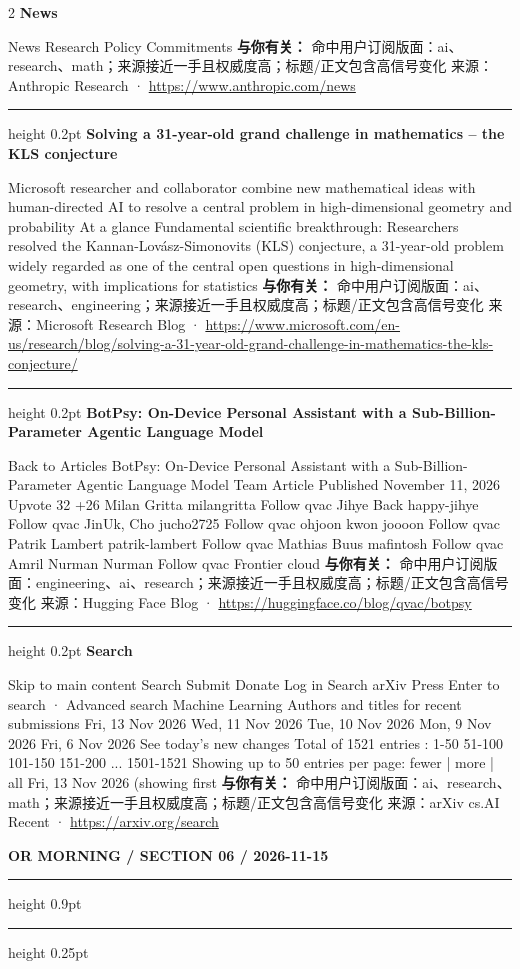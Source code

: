 \documentclass[10.5pt]{ctexart}
\begin{document}
\begin{multicols}{2}
{\large\bfseries News}\par
News Research Policy Commitments
\textbf{与你有关：} 命中用户订阅版面：ai、research、math；来源接近一手且权威度高；标题/正文包含高信号变化
{\footnotesize\color{ormuted} 来源：Anthropic Research · \url{https://www.anthropic.com/news}}
\vspace{2mm}
\hrule height 0.2pt
\vspace{2mm}
{\large\bfseries Solving a 31-year-old grand challenge in mathematics – the KLS conjecture}\par
Microsoft researcher and collaborator combine new mathematical ideas with human-directed AI to resolve a central problem in high-dimensional geometry and probability At a glance Fundamental scientific breakthrough: Researchers resolved the Kannan-Lovász-Simonovits (KLS) conjecture, a 31-year-old problem widely regarded as one of the central open questions in high-dimensional geometry, with implications for statistics
\textbf{与你有关：} 命中用户订阅版面：ai、research、engineering；来源接近一手且权威度高；标题/正文包含高信号变化
{\footnotesize\color{ormuted} 来源：Microsoft Research Blog · \url{https://www.microsoft.com/en-us/research/blog/solving-a-31-year-old-grand-challenge-in-mathematics-the-kls-conjecture/}}
\vspace{2mm}
\hrule height 0.2pt
\vspace{2mm}
{\large\bfseries BotPsy: On-Device Personal Assistant with a Sub-Billion-Parameter Agentic Language Model}\par
Back to Articles BotPsy: On-Device Personal Assistant with a Sub-Billion-Parameter Agentic Language Model Team Article Published November 11, 2026 Upvote 32 +26 Milan Gritta milangritta Follow qvac Jihye Back happy-jihye Follow qvac JinUk, Cho jucho2725 Follow qvac ohjoon kwon joooon Follow qvac Patrik Lambert patrik-lambert Follow qvac Mathias Buus mafintosh Follow qvac Amril Nurman Nurman Follow qvac Frontier cloud
\textbf{与你有关：} 命中用户订阅版面：engineering、ai、research；来源接近一手且权威度高；标题/正文包含高信号变化
{\footnotesize\color{ormuted} 来源：Hugging Face Blog · \url{https://huggingface.co/blog/qvac/botpsy}}
\vspace{2mm}
\hrule height 0.2pt
\vspace{2mm}
{\large\bfseries Search}\par
Skip to main content Search Submit Donate Log in Search arXiv Press Enter to search · Advanced search Machine Learning Authors and titles for recent submissions Fri, 13 Nov 2026 Wed, 11 Nov 2026 Tue, 10 Nov 2026 Mon, 9 Nov 2026 Fri, 6 Nov 2026 See today's new changes Total of 1521 entries : 1-50 51-100 101-150 151-200 ... 1501-1521 Showing up to 50 entries per page: fewer | more | all Fri, 13 Nov 2026 (showing first 
\textbf{与你有关：} 命中用户订阅版面：ai、research、math；来源接近一手且权威度高；标题/正文包含高信号变化
{\footnotesize\color{ormuted} 来源：arXiv cs.AI Recent · \url{https://arxiv.org/search}}
\end{multicols}
\newpage
{\small\bfseries OR MORNING / SECTION 06 / 2026-11-15}
\vspace{2mm}
\hrule height 0.9pt
\vspace{1.5mm}
\hrule height 0.25pt
\vspace{4mm}
\end{document}
